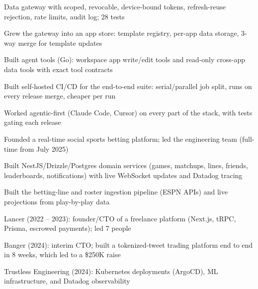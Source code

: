 \documentclass[print]{jack-resume}
\begin{document}
\begin{tightemize}
    \item Data gateway with scoped, revocable, device-bound tokens, refresh-reuse rejection, rate limits, audit log; 28 tests
    \item Grew the gateway into an app store: template registry, per-app data storage, 3-way merge for template updates
    \item Built agent tools (Go): workspace app write/edit tools and read-only cross-app data tools with exact tool contracts
    \item Built self-hosted CI/CD for the end-to-end suite: serial/parallel job split, runs on every release merge, cheaper per run
    \item Worked agentic-first (Claude Code, Cursor) on every part of the stack, with tests gating each release
\end{tightemize}
\sectionsep

\begin{tightemize}
    \item Founded a real-time social sports betting platform; led the engineering team (full-time from July 2025)
    \item Built NestJS/Drizzle/Postgres domain services (games, matchups, lines, friends, leaderboards, notifications) with live WebSocket updates and Datadog tracing
    \item Built the betting-line and roster ingestion pipeline (ESPN APIs) and live projections from play-by-play data
\end{tightemize}
\sectionsep

\begin{tightemize}
    \item Lancer (2022 -- 2023): founder/CTO of a freelance platform (Next.js, tRPC, Prisma, escrowed payments); led 7 people
    \item Banger (2024): interim CTO; built a tokenized-tweet trading platform end to end in 8 weeks, which led to a \$250K raise
    \item Trustless Engineering (2024): Kubernetes deployments (ArgoCD), ML infrastructure, and Datadog observability
\end{tightemize}
\sectionsep
\end{document}
